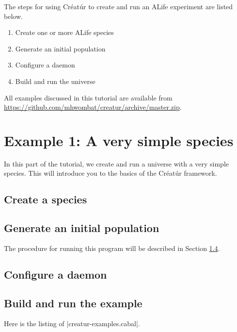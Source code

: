 \documentclass[a4paper,10pt]{report}
\begin{document}
The steps for using Créatúr to create and run an ALife experiment
are listed below.

\begin{enumerate}
\item Create one or more ALife species
\item Generate an initial population
\item Configure a daemon
\item Build and run the universe
\end {enumerate}

All examples discussed in this tutorial are available from
\url{https://github.com/mhwombat/creatur/archive/master.zip}.

\chapter{Example 1: A very simple species}
\label{sec:rock}

In this part of the tutorial, we create and run a universe
with a very simple species.
This will introduce you to the basics of the Créatúr framework.

\section{Create a species}
\label{sec:species1}



\section{Generate an initial population}
\label{sec:pop1}



The procedure for running this program will be described in Section 
\ref{sec:run1}.

\section{Configure a daemon}
\label{sec:daemon1}



\section{Build and run the example}
\label{sec:run1}


Here is the listing of |creatur-examples.cabal|.

\end{document}
